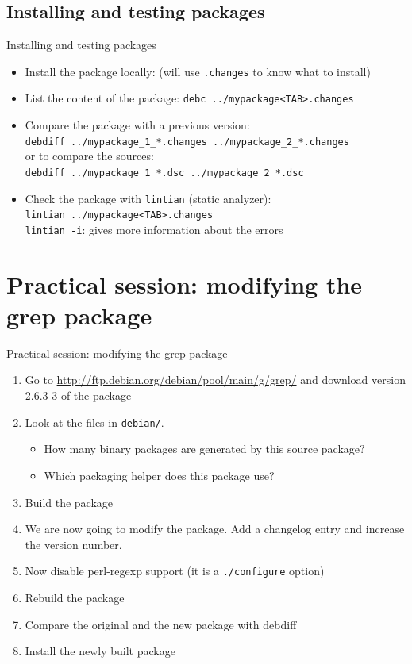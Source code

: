 \documentclass[10pt,final]{beamer}
\begin{document}
\subsection{Installing and testing packages}
\begin{frame}{Installing and testing packages}
\begin{itemize}
	\item Install the package locally:  (will use \texttt{.changes} to know what to install)
		\br
	\item List the content of the package: \texttt{{\color{rouge}debc} ../mypackage<TAB>.changes}
		\br
	\item Compare the package with a previous version:\\
		\texttt{{\color{rouge}debdiff} ../mypackage\_1\_*.changes ../mypackage\_2\_*.changes}\\
		or to compare the sources:\\
		\texttt{{\color{rouge}debdiff} ../mypackage\_1\_*.dsc ../mypackage\_2\_*.dsc}\\
		\br
	\item Check the package with \texttt{lintian} (static analyzer):\\
		\texttt{{\color{rouge}lintian} ../mypackage<TAB>.changes}\\
		\texttt{lintian -i}: gives more information about the errors
\end{itemize}
\end{frame}
\section{Practical session: modifying the grep package}
\begin{frame}{Practical session: modifying the grep package}
\begin{enumerate}
	\item Go to \url{http://ftp.debian.org/debian/pool/main/g/grep/} and
		download version 2.6.3-3 of the package
	\item Look at the files in \texttt{debian/}.
		\begin{itemize}
			\item 		How many binary packages are generated by this source package?
			\item 		Which packaging helper does this package use?
		\end{itemize}
	\item Build the package
	\item We are now going to modify the package. Add a changelog entry and increase the version number.
	\item Now disable perl-regexp support (it is a \texttt{./configure} option)
	\item Rebuild the package
	\item Compare the original and the new package with debdiff
	\item Install the newly built package
\end{enumerate}
\end{frame}
\end{document}
